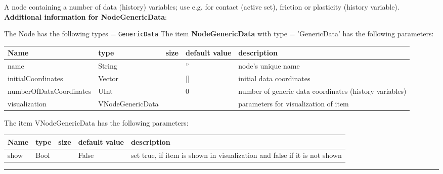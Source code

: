 \label{sec:item:NodeGenericData}
A node containing a number of data (history) variables; use e.g. for contact (active set), friction or plasticity (history variable).\vspace{12pt}
 \\{\bf Additional information for NodeGenericData}:
\bi
  \item The Node has the following types = \texttt{GenericData}
\ei
\vspace{12pt} \noindent The item {\bf NodeGenericData} with type = 'GenericData' has the following parameters:\vspace{-1cm}\\ 
\begin{center}
  \footnotesize
  \begin{longtable}{| p{4.5cm} | p{2.5cm} | p{0.5cm} | p{2.5cm} | p{6cm} |}
    \hline
    \bf Name & \bf type & \bf size & \bf default value & \bf description \\ \hline
    name &     String &      &     '' &     node's unique name\\ \hline
    initialCoordinates &     Vector &      &     [] &     initial data coordinates\\ \hline
    numberOfDataCoordinates &     UInt &      &     0 &     number of generic data coordinates (history variables)\\ \hline
    visualization & VNodeGenericData & & & parameters for visualization of item \\ \hline
	  \end{longtable}
	\end{center}
The item VNodeGenericData has the following parameters:\vspace{-1cm}\\ 
\begin{center}
  \footnotesize
  \begin{longtable}{| p{4.5cm} | p{2.5cm} | p{0.5cm} | p{2.5cm} | p{6cm} |}
    \hline
    \bf Name & \bf type & \bf size & \bf default value & \bf description \\ \hline
    show &     Bool &      &     False &     set true, if item is shown in visualization and false if it is not shown\\ \hline
	  \end{longtable}
	\end{center}
\par\noindent\rule{\textwidth}{0.4pt}
\label{description_NodeGenericData}
